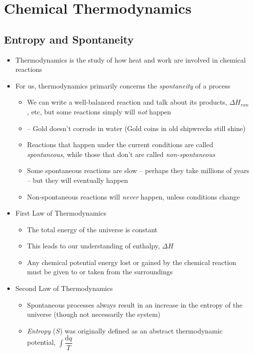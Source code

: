 \documentclass[12pt, openany, letterpaper]{memoir}
\begin{document}
\chapter{Chemical Thermodynamics}
\section{Entropy and Spontaneity}
\begin{itemize}
	\item Thermodynamics is the study of how heat and work are involved in chemical reactions
	\item For us, thermodynamics primarily concerns the \emph{spontaneity} of a process
	\begin{itemize}
		\item We can write a well-balanced reaction and talk about its products, $\Delta H_{rxn}$, etc, but some reactions simply will \emph{not} happen
		\item {} -- Gold doesn't corrode in water (Gold coins in old shipwrecks still shine)
		\item Reactions that happen under the current conditions are called \emph{spontaneous}, while those that don't are called \emph{non-spontaneous}
		\item Some spontaneous reactions are slow -- perhaps they take millions of years -- but they will eventually happen
		\item Non-spontaneous reactions will \emph{never} happen, unless conditions change
	\end{itemize}
	\item First Law of Thermodynamics
	\begin{itemize}
		\item The total energy of the universe is constant
		\item This leads to our understanding of enthalpy, $\Delta H$
		\item Any chemical potential energy lost or gained by the chemical reaction must be given to or taken from the surroundings
	\end{itemize}
	\item Second Law of Thermodynamics
	\begin{itemize}
		\item Spontaneous processes always result in an increase in the entropy of the universe (though not necessarily the system)
		\item \emph{Entropy} ($S$) was originally defined as an abstract thermodynamic potential, $\int \dfrac{\mathrm{d}q}{T}$

\end{itemize}
\end{itemize}
\end{document}
